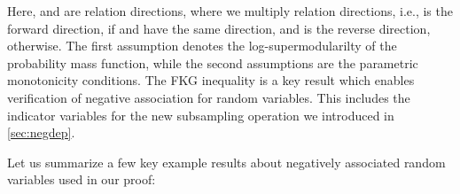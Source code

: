Here, \isa{\isasymsigma} and \isa{\isasymtau} are relation directions, where we multiply relation directions, i.e., \isa{\isasymsigma\ \isacharasterisk\ \isasymtau} is the forward direction, if \isa{\isasymsigma} and \isa{\isasymtau} have the same direction, and \isa{\isasymsigma\ \isacharasterisk\ \isasymtau} is the reverse direction, otherwise.
The first assumption denotes the log-supermodularilty of the probability mass function, while the second assumptions are the parametric monotonicity conditions.
The FKG inequality is a key result which enables verification of negative association for random variables.
This includes the indicator variables for the new subsampling operation we introduced in \cref{sec:negdep}.

Let us summarize a few key example results about negatively associated random variables used in our proof:
